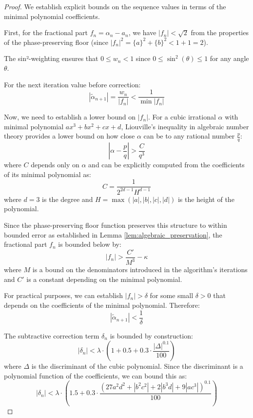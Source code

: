 \begin{proof}
We establish explicit bounds on the sequence values in terms of the minimal polynomial coefficients.

First, for the fractional part $f_n = \alpha_n - a_n$, we have $|f_n| < \sqrt{2}$ from the properties of the phase-preserving floor (since $|f_n|^2 = \{a\}^2 + \{b\}^2 < 1 + 1 = 2$).

The sin²-weighting ensures that $0 \leq w_n < 1$ since $0 \leq \sin^2(\theta) \leq 1$ for any angle $\theta$.

For the next iteration value before correction:
\begin{equation}
|\tilde{\alpha}_{n+1}| = \frac{w_n}{|f_n|} < \frac{1}{\min|f_n|}
\end{equation}

Now, we need to establish a lower bound on $|f_n|$. For a cubic irrational $\alpha$ with minimal polynomial $ax^3 + bx^2 + cx + d$, Liouville's inequality in algebraic number theory provides a lower bound on how close $\alpha$ can be to any rational number $\frac{p}{q}$:
\begin{equation}
\left|\alpha - \frac{p}{q}\right| > \frac{C}{q^3}
\end{equation}
where $C$ depends only on $\alpha$ and can be explicitly computed from the coefficients of its minimal polynomial as:
\begin{equation}
C = \frac{1}{2^{2d-1}H^{d-1}}
\end{equation}
where $d=3$ is the degree and $H = \max(|a|, |b|, |c|, |d|)$ is the height of the polynomial.

Since the phase-preserving floor function preserves this structure to within bounded error as established in Lemma \ref{lem:algebraic_preservation}, the fractional part $f_n$ is bounded below by:
\begin{equation}
|f_n| > \frac{C'}{M^3} - \kappa
\end{equation}
where $M$ is a bound on the denominators introduced in the algorithm's iterations and $C'$ is a constant depending on the minimal polynomial.

For practical purposes, we can establish $|f_n| > \delta$ for some small $\delta > 0$ that depends on the coefficients of the minimal polynomial. Therefore:
\begin{equation}
|\tilde{\alpha}_{n+1}| < \frac{1}{\delta}
\end{equation}

The subtractive correction term $\delta_n$ is bounded by construction:
\begin{equation}
|\delta_n| < \lambda \cdot (1 + 0.5 + 0.3 \cdot \frac{|\Delta|^{0.1}}{100})
\end{equation}
where $\Delta$ is the discriminant of the cubic polynomial. Since the discriminant is a polynomial function of the coefficients, we can bound this as:
\begin{equation}
|\delta_n| < \lambda \cdot (1.5 + 0.3 \cdot \frac{(27a^2d^2 + |b^2c^2| + 2|b^3d| + 9|ac^3|)^{0.1}}{100})
\end{equation}


\end{proof}
